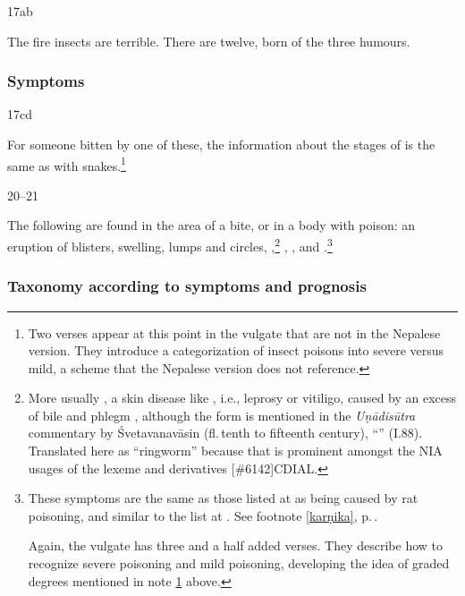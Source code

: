 \begin{translation}
\item[17ab]

The fire insects are terrible.  There are twelve, born of the three
humours.

\subsubsection{Symptoms}

\item[17cd] 

For someone bitten by one of these, the information about the stages
of  is the same as with snakes.\footnote{Two
    verses appear at this point in the vulgate that are not in the
    Nepalese version.  They introduce a categorization of insect poisons
    into severe versus mild, a scheme that the Nepalese version does not
    reference.\label{gradation}}

\item[20--21] 

The following are found in the area of a bite, or in a body
 with poison: an eruption of blisters, swelling,
lumps and circles, ,\footnote{More usually
    , a skin disease like , i.e., leprosy or
    vitiligo, caused by an excess of bile and phlegm
    \citep[390]{josi-maha}, although the form  is mentioned in
    the \emph{Uṇādisūtra} commentary by Śvetavanavāsin (fl.\,tenth to
    fifteenth century), “” (I.88). Translated
    here as “ringworm” because that is prominent amongst the NIA usages of
    the lexeme and derivatives
    [\#6142]{CDIAL}.} %
, ,
and .\footnote{These symptoms
    are the same as those listed at  as being caused by rat
    poisoning, and similar to the list at .  See footnote
    \ref{karṇika}, p.\,\pageref{karṇika}.
    
    Again, the vulgate has three and a half added verses.  They describe how to 
    recognize severe poisoning and mild poisoning, developing the idea of graded 
    degrees mentioned in note \ref{gradation} above.}

\subsubsection{Taxonomy according to symptoms and prognosis}


\end{translation}
